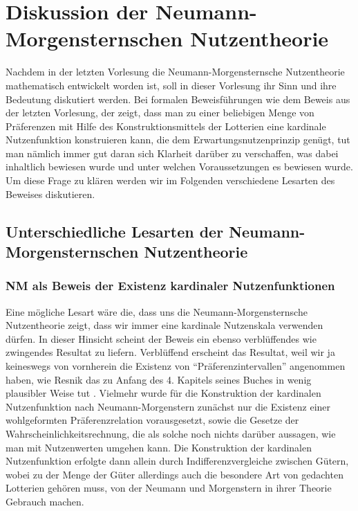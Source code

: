 \section{Diskussion der Neu\-mann-Morgen\-stern\-schen Nut\-zen\-theorie}
\label{DiskussionNeumannMorgenstern}

Nachdem in der letzten Vorlesung die Neumann-Morgensternsche Nutzentheorie
mathematisch entwickelt worden ist, soll in dieser Vorlesung ihr Sinn und ihre
Bedeutung diskutiert werden. Bei formalen Beweisführungen wie dem Beweis aus der
letzten Vorlesung, der zeigt, dass man zu einer beliebigen Menge von Präferenzen
mit Hilfe des Konstruktionsmittels der Lotterien eine kardinale Nutzenfunktion
konstruieren kann, die dem Erwartungsnutzenprinzip genügt, tut man nämlich immer
gut daran sich Klarheit darüber zu verschaffen, was dabei inhaltlich bewiesen
wurde und unter welchen Voraussetzungen es bewiesen wurde. Um diese Frage zu
klären werden wir im Folgenden verschiedene Lesarten des Beweises diskutieren.

\subsection{Unterschiedliche Lesarten der Neu\-mann-Morgen\-stern\-schen
Nutzentheorie}

\subsubsection{NM als Beweis der Existenz kardinaler Nutzenfunktionen}
\label{LesartKardinalerNutzen}

Eine mögliche Lesart wäre die, dass uns die Neumann-Morgensternsche
Nutzentheorie zeigt, dass wir immer eine kardinale Nutzenskala verwenden
dürfen. In dieser Hinsicht scheint der Beweis ein ebenso verblüffendes wie
zwingendes Resultat zu liefern. Verblüffend erscheint das Resultat, weil wir ja
keineswegs von vornherein die Existenz von
"`Präferenzintervallen"' angenommen haben, wie Resnik das zu Anfang des 4.
Kapitels seines Buches in wenig plausibler Weise tut \cite[S.
82]{resnik:1987}. Vielmehr wurde für die Konstruktion der 
kardinalen Nutzenfunktion nach Neumann-Morgenstern zunächst
nur die Existenz einer wohlgeformten Präferenzrelation vorausgesetzt, sowie
die Gesetze der Wahrscheinlichkeitsrechnung, die als solche noch nichts 
darüber aussagen, wie man mit Nutzenwerten umgehen kann. Die Konstruktion 
der kardinalen Nutzenfunktion erfolgte dann allein durch 
Indifferenzvergleiche zwischen Gütern, wobei zu der Menge der Güter 
allerdings auch die besondere Art von gedachten Lotterien gehören muss, 
von der Neumann und Morgenstern in ihrer Theorie Gebrauch machen.

